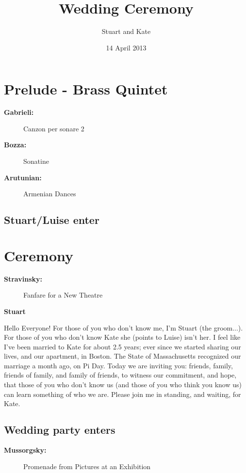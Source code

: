 \documentclass[twoside]{article}
\author{Stuart and Kate}
\title{Wedding Ceremony}
\date{14 April 2013}
\begin{document}
  \maketitle
  
  \section{Prelude - Brass Quintet}
    \begin{description}
      \item[\textbf{Gabrieli:}] Canzon per sonare 2
      \item[\textbf{Bozza:}] Sonatine
      \item[\textbf{Arutunian:}] Armenian Dances
    \end{description}
    \subsection{Stuart/Luise enter}
    
  \section{Ceremony}
    \begin{description}
      \item[\textbf{Stravinsky:}] Fanfare for a New Theatre
    \end{description}
  
  	\begin{center}
      \textbf{Stuart}
    \end{center}
Hello Everyone! For those of you who don’t know me, I'm Stuart (the groom...). For those of you who don't know Kate she (points to Luise) isn't her. I feel like I've been married to Kate for about 2.5 years; ever since we started sharing our lives, and our apartment, in Boston. The State of Massachusetts recognized our marriage a month ago, on Pi Day. Today we are inviting you: friends, family, friends of family, and family of friends, to witness our commitment, and hope, that those of you who don't know us (and those of you who think you know us) can learn something of who we are. Please join me in standing, and waiting, for Kate.
		
    \subsection{Wedding party enters}
      \begin{description}
        \item[\textbf{Mussorgsky:}] Promenade from Pictures at an Exhibition
      \end{description}
  		
\end{document}
